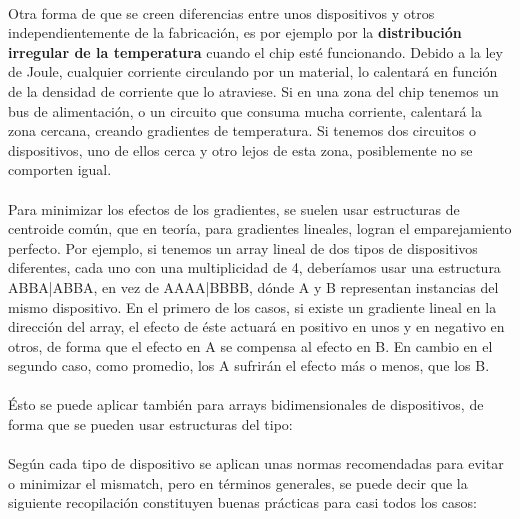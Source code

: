 \paragraph{} Otra forma de que se creen diferencias entre unos dispositivos y otros
independientemente de la fabricación, es por ejemplo por la \textbf{distribución irregular
de la temperatura} cuando el chip esté funcionando. Debido a la ley de Joule, cualquier
corriente circulando por un material, lo calentará en función de la densidad de corriente
que lo atraviese. Si en una zona del chip tenemos un bus de alimentación, o un circuito
que consuma mucha corriente, calentará la zona cercana, creando gradientes de temperatura.
Si tenemos dos circuitos o dispositivos, uno de ellos cerca y otro lejos de esta zona,
posiblemente no se comporten igual.

\paragraph{} Para minimizar los efectos de los gradientes, se suelen usar estructuras
de centroide común, que en teoría, para gradientes lineales, logran el emparejamiento
perfecto. Por ejemplo, si tenemos un array lineal de dos tipos de dispositivos diferentes,
cada uno con una multiplicidad de 4, deberíamos usar una estructura ABBA|ABBA, en vez
de AAAA|BBBB, dónde A y B representan instancias del mismo dispositivo. En el primero
de los casos, si existe un gradiente lineal en la dirección del array, el efecto de éste
actuará en positivo en unos y en negativo en otros, de forma que el efecto en A se compensa
al efecto en B. En cambio en el segundo caso, como promedio, los A sufrirán el efecto
más o menos, que los B.

\paragraph{} Ésto se puede aplicar también para arrays bidimensionales de dispositivos,
de forma que se pueden usar estructuras del tipo:



\paragraph{} Según cada tipo de dispositivo se aplican unas normas recomendadas para
evitar o minimizar el mismatch, pero en términos generales, se puede decir que la
siguiente recopilación constituyen buenas prácticas para casi todos los casos:
